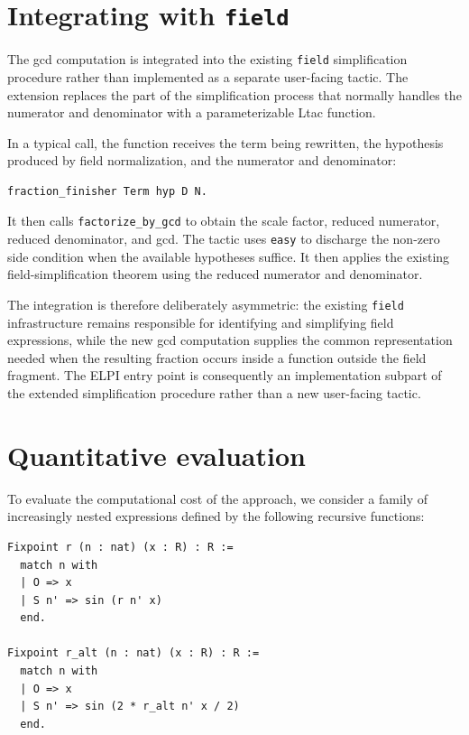 \documentclass[11pt]{article}
\begin{document}
\section{Integrating with \texttt{field}}


The gcd computation is integrated into the existing \texttt{field}
simplification procedure rather than implemented as a separate user-facing
tactic. The extension replaces the part of the simplification process that
normally handles the numerator and denominator with a parameterizable Ltac
function. 

In a typical call, the function receives the term being rewritten, the
hypothesis produced by field normalization, and the numerator and denominator:
\begin{lstlisting}[language=ML]
fraction_finisher Term hyp D N.
\end{lstlisting}

It then calls \texttt{factorize\_by\_gcd} to obtain the scale factor, reduced
numerator, reduced denominator, and gcd. The tactic uses \texttt{easy} to discharge the non-zero side condition when the available hypotheses suffice. It then applies the existing field-simplification theorem using the reduced numerator and denominator.


The integration is therefore deliberately asymmetric: the existing
\texttt{field} infrastructure remains responsible for identifying and
simplifying field expressions, while the new gcd computation supplies the
common representation needed when the resulting fraction occurs inside a
function outside the field fragment. The ELPI entry point is consequently an
implementation subpart of the extended simplification procedure rather than a
new user-facing tactic.

\section{Quantitative evaluation}

To evaluate the computational cost of the approach, we consider a
family of increasingly nested expressions defined by the following
recursive functions:

\begin{lstlisting}[language=Rocq]
Fixpoint r (n : nat) (x : R) : R :=
  match n with
  | O => x
  | S n' => sin (r n' x)
  end.

Fixpoint r_alt (n : nat) (x : R) : R :=
  match n with
  | O => x
  | S n' => sin (2 * r_alt n' x / 2)
  end.
\end{lstlisting}
\end{document}
